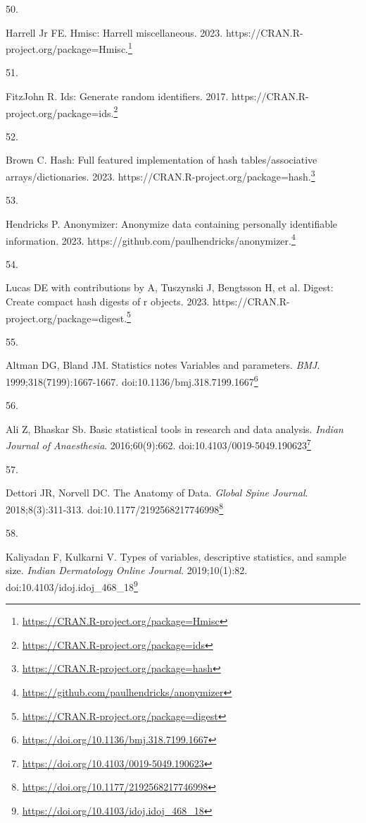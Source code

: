 \documentclass[
  a4paper,
]{book}
\newlength{\cslhangindent}
\newlength{\csllabelwidth}
\newlength{\cslentryspacingunit} %
\newenvironment{CSLReferences}[2] %
 {%
  \setlength{\parindent}{0pt}
  \ifodd #1
  \let\oldpar\par
  \def\par{\hangindent=\cslhangindent\oldpar}
  \fi
  \setlength{\parskip}{#2\cslentryspacingunit}
 }%
 {}
\newcommand{\CSLLeftMargin}[1]{\parbox[t]{\csllabelwidth}{#1}}
\newcommand{\CSLRightInline}[1]{\parbox[t]{\linewidth - \csllabelwidth}{#1}\break}
\renewcommand{\href}[2]{#2\footnote{\url{#1}}}
\begin{document}
\begin{CSLReferences}{0}{0}
\leavevmode{}%
\CSLLeftMargin{50. }%
\CSLRightInline{Harrell Jr FE. Hmisc: Harrell miscellaneous. 2023. \href{https://CRAN.R-project.org/package=Hmisc}{https://CRAN.R-project.org/package=Hmisc.}}

\leavevmode{}%
\CSLLeftMargin{51. }%
\CSLRightInline{FitzJohn R. Ids: Generate random identifiers. 2017. \href{https://CRAN.R-project.org/package=ids}{https://CRAN.R-project.org/package=ids.}}

\leavevmode{}%
\CSLLeftMargin{52. }%
\CSLRightInline{Brown C. Hash: Full featured implementation of hash tables/associative arrays/dictionaries. 2023. \href{https://CRAN.R-project.org/package=hash}{https://CRAN.R-project.org/package=hash.}}

\leavevmode{}%
\CSLLeftMargin{53. }%
\CSLRightInline{Hendricks P. Anonymizer: Anonymize data containing personally identifiable information. 2023. \href{https://github.com/paulhendricks/anonymizer}{https://github.com/paulhendricks/anonymizer.}}

\leavevmode{}%
\CSLLeftMargin{54. }%
\CSLRightInline{Lucas DE with contributions by A, Tuszynski J, Bengtsson H, et al. Digest: Create compact hash digests of r objects. 2023. \href{https://CRAN.R-project.org/package=digest}{https://CRAN.R-project.org/package=digest.}}

\leavevmode{}%
\CSLLeftMargin{55. }%
\CSLRightInline{Altman DG, Bland JM. Statistics notes Variables and parameters. \emph{BMJ}. 1999;318(7199):1667-1667. doi:\href{https://doi.org/10.1136/bmj.318.7199.1667}{10.1136/bmj.318.7199.1667}}

\leavevmode{}%
\CSLLeftMargin{56. }%
\CSLRightInline{Ali Z, Bhaskar Sb. Basic statistical tools in research and data analysis. \emph{Indian Journal of Anaesthesia}. 2016;60(9):662. doi:\href{https://doi.org/10.4103/0019-5049.190623}{10.4103/0019-5049.190623}}

\leavevmode{}%
\CSLLeftMargin{57. }%
\CSLRightInline{Dettori JR, Norvell DC. The Anatomy of Data. \emph{Global Spine Journal}. 2018;8(3):311-313. doi:\href{https://doi.org/10.1177/2192568217746998}{10.1177/2192568217746998}}

\leavevmode{}%
\CSLLeftMargin{58. }%
\CSLRightInline{Kaliyadan F, Kulkarni V. Types of variables, descriptive statistics, and sample size. \emph{Indian Dermatology Online Journal}. 2019;10(1):82. doi:\href{https://doi.org/10.4103/idoj.idoj_468_18}{10.4103/idoj.idoj\_468\_18}}


\end{CSLReferences}
\end{document}
